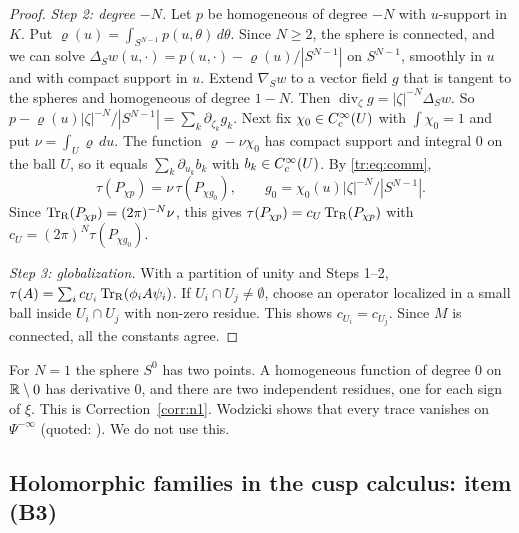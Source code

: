 \begin{proof}
\emph{Step 2: degree \(-N\).} Let \(p\) be homogeneous of degree \(-N\) with
\(u\)-support in \(K\). Put \(\varrho(u)=\int_{S^{N-1}}p(u,\theta)\,d\theta\).
Since \(N\ge2\), the sphere is connected, and we can solve
\(\Delta_{S}w(u,\cdot)=p(u,\cdot)-\varrho(u)/|S^{N-1}|\) on \(S^{N-1}\),
smoothly in \(u\) and with compact support in \(u\). Extend \(\nabla_Sw\) to
a vector field \(g\) that is tangent to the spheres and homogeneous of degree
\(1-N\). Then \(\operatorname{div}_\zeta g=|\zeta|^{-N}\Delta_Sw\). So
\(p-\varrho(u)|\zeta|^{-N}/|S^{N-1}|=\sum_k\partial_{\zeta_k}g_k\). Next fix
\(\chi_0\in C^\infty_c(U)\) with \(\int\chi_0=1\) and put \(\nu=\int_U\varrho\,
du\). The function \(\varrho-\nu\chi_0\) has compact support and integral
\(0\) on the ball \(U\), so it equals \(\sum_k\partial_{u_k}b_k\) with
\(b_k\in C^\infty_c(U)\). By \eqref{tr:eq:comm},
\[
 \tau(P_{\chi p})=\nu\,\tau(P_{\chi g_0}),\qquad
 g_0=\chi_0(u)|\zeta|^{-N}/|S^{N-1}| .
\]
Since \(\operatorname{Tr}_{\mathrm R}(P_{\chi p})=(2\pi)^{-N}\nu\), this gives
\(\tau(P_{\chi p})=c_U\operatorname{Tr}_{\mathrm R}(P_{\chi p})\) with
\(c_U=(2\pi)^N\tau(P_{\chi g_0})\).

\emph{Step 3: globalization.} With a partition of unity and Steps 1--2,
\(\tau(A)=\sum_ic_{U_i}\operatorname{Tr}_{\mathrm R}(\phi_iA\psi_i)\). If \(U_i\cap U_j\neq
\emptyset\), choose an operator localized in a small ball inside
\(U_i\cap U_j\) with non-zero residue. This shows \(c_{U_i}=c_{U_j}\). Since
\(M\) is connected, all the constants agree.
\end{proof}

For \(N=1\) the sphere \(S^0\) has two points. A homogeneous function of
degree \(0\) on \(\mathbb R\setminus0\) has derivative \(0\), and there are two
independent residues, one for each sign of \(\xi\). This is
Correction~\ref{corr:n1}. Wodzicki shows that every trace vanishes on
\(\Psi^{-\infty}\) (quoted: \cite{Wodzicki-residue}). We do not use this.

\subsection{Holomorphic families in the cusp calculus: item (B3)}
\label{tr:subsec:cusp}

